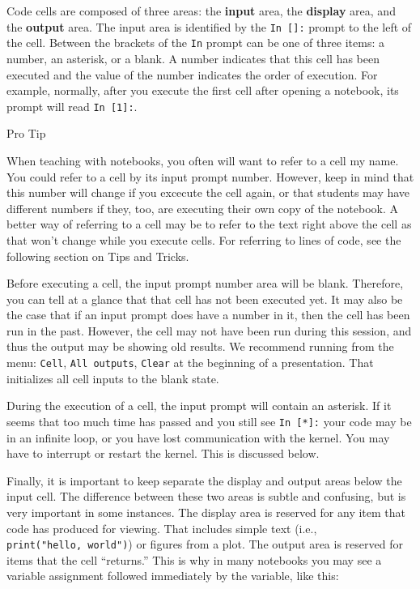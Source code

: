 \documentclass[]{book}
\let\BeginKnitrBlock\begin \let\EndKnitrBlock\end
\begin{document}
Code cells are composed of three areas: the \textbf{input} area, the
\textbf{display} area, and the \textbf{output} area. The input area is identified by
the \texttt{In\ {[}{]}:} prompt to the left of the cell. Between the brackets of
the \texttt{In} prompt can be one of three items: a number, an asterisk, or a
blank. A number indicates that this cell has been executed and the
value of the number indicates the order of execution. For example,
normally, after you execute the first cell after opening a notebook,
its prompt will read \texttt{In\ {[}1{]}:}.

\BeginKnitrBlock{rmdnote}
Pro Tip

When teaching with notebooks, you often will want to refer to a cell
my name. You could refer to a cell by its input prompt
number. However, keep in mind that this number will change if you
excecute the cell again, or that students may have different numbers
if they, too, are executing their own copy of the notebook. A better
way of referring to a cell may be to refer to the text right above the
cell as that won't change while you execute cells. For referring to
lines of code, see the following section on Tips and Tricks.
\EndKnitrBlock{rmdnote}

Before executing a cell, the input prompt number area will be
blank. Therefore, you can tell at a glance that that cell has not been
executed yet. It may also be the case that if an input prompt does
have a number in it, then the cell has been run in the past. However,
the cell may not have been run during this session, and thus the
output may be showing old results. We recommend running from the menu:
\texttt{Cell}, \texttt{All\ outputs}, \texttt{Clear} at the beginning of a
presentation. That initializes all cell inputs to the blank state.

During the execution of a cell, the input prompt will contain an
asterisk. If it seems that too much time has passed and you still see
\texttt{In\ {[}*{]}:} your code may be in an infinite loop, or you have lost
communication with the kernel. You may have to interrupt or restart
the kernel. This is discussed below.

Finally, it is important to keep separate the display and output areas
below the input cell. The difference between these two areas is subtle
and confusing, but is very important in some instances. The display
area is reserved for any item that code has produced for viewing. That
includes simple text (i.e., \texttt{print("hello,\ world")}) or figures from a
plot. The output area is reserved for items that the cell ``returns.''
This is why in many notebooks you may see a variable assignment
followed immediately by the variable, like this:
\end{document}
